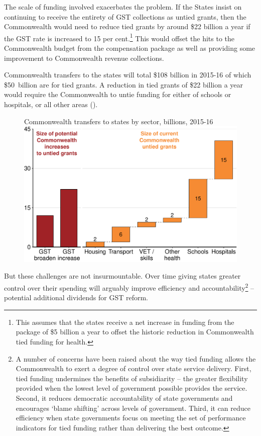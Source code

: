 \documentclass{grattanAlpha}
\begin{document}
The scale of funding involved exacerbates the problem. If the States insist on continuing to receive the entirety of GST collections as untied grants, then the Commonwealth would need to reduce tied grants by around \$22 billion a year if the GST rate is increased to 15 per cent.\footnote{This assumes that the states receive a net increase in funding from the package of \$5 billion a year to offset the historic reduction in Commonwealth tied funding for health.}   This would offset the hits to the Commonwealth budget from the compensation package as well as providing some improvement to Commonwealth revenue collections.

Commonwealth transfers to the states will total \$108 billion in \mbox{2015-16} of which \$50~billion are for tied grants. A reduction in tied grants of \$22 billion a year would require the Commonwealth to untie funding for either of schools or hospitals, or all other areas (). 

\begin{figure}
%
{Commonwealth transfers to states by sector, billions, 2015-16}
\includegraphics[width=\columnwidth]{atlas/figure/GST-Figure-10-2.pdf}
\end{figure}

But these challenges are not insurmountable. Over time giving states greater control over their spending will arguably improve efficiency and accountability\footnote{ A number of concerns have been raised about the way tied funding allows the Commonwealth to exert a degree of control over state service delivery. First, tied funding undermines the benefits of subsidiarity – the greater flexibility provided when the lowest level of government possible provides the service. Second, it reduces democratic accountability of state governments and encourages ‘blame shifting’ across levels of government. Third, it can reduce efficiency when state governments focus on meeting the set of performance indicators for tied funding rather than delivering the best outcome.}  – potential additional dividends for GST reform.
\end{document}
